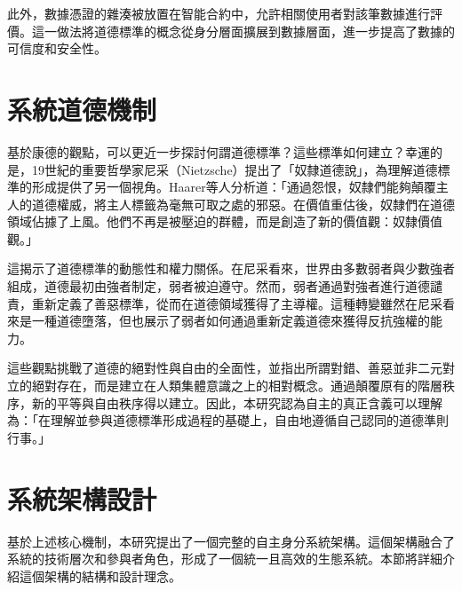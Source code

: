 此外，數據憑證的雜湊被放置在智能合約中，允許相關使用者對該筆數據進行評價。這一做法將道德標準的概念從身分層面擴展到數據層面，進一步提高了數據的可信度和安全性。
\section{系統道德機制}
基於康德的觀點，可以更近一步探討何謂道德標準？這些標準如何建立？幸運的是，19世紀的重要哲學家尼采（Nietzsche）提出了「奴隸道德說」，為理解道德標準的形成提供了另一個視角。Haarer等人\cite{haarer2020nietzsche}分析道：「通過怨恨，奴隸們能夠顛覆主人的道德權威，將主人標籤為毫無可取之處的邪惡。在價值重估後，奴隸們在道德領域佔據了上風。他們不再是被壓迫的群體，而是創造了新的價值觀：奴隸價值觀。」

這揭示了道德標準的動態性和權力關係。在尼采看來，世界由多數弱者與少數強者組成，道德最初由強者制定，弱者被迫遵守。然而，弱者通過對強者進行道德譴責，重新定義了善惡標準，從而在道德領域獲得了主導權。這種轉變雖然在尼采看來是一種道德墮落，但也展示了弱者如何通過重新定義道德來獲得反抗強權的能力。

這些觀點挑戰了道德的絕對性與自由的全面性，並指出所謂對錯、善惡並非二元對立的絕對存在，而是建立在人類集體意識之上的相對概念。通過顛覆原有的階層秩序，新的平等與自由秩序得以建立。因此，本研究認為自主的真正含義可以理解為：「在理解並參與道德標準形成過程的基礎上，自由地遵循自己認同的道德準則行事。」
\section{系統架構設計}
基於上述核心機制，本研究提出了一個完整的自主身分系統架構。這個架構融合了系統的技術層次和參與者角色，形成了一個統一且高效的生態系統。本節將詳細介紹這個架構的結構和設計理念。
